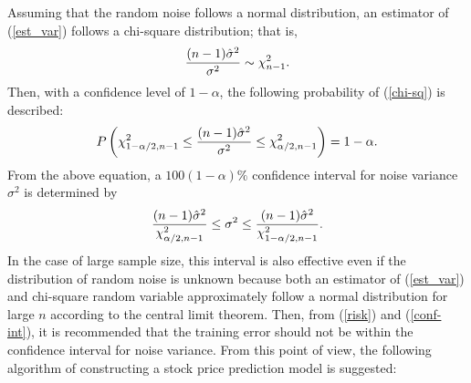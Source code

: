 \documentclass[runningheads,a4paper]{llncs}
\begin{document}
Assuming that the random noise follows a normal distribution, an estimator of (\ref{est_var}) follows
a chi-square distribution; that is,
\begin{equation}
{{(n-1)\hat{\sigma}^2}\over{\sigma^2}} \sim \chi_{n-1}^2.
\label{chi-sq}
\end{equation}
Then, with a confidence level of $1-\alpha$, the following probability of (\ref{chi-sq}) is described:
\begin{equation}
P\left( \chi_{1-\alpha/2, n-1}^2\le {{(n-1)\hat{\sigma}^2}\over{\sigma^2}}\le \chi_{\alpha/2, n-1}^2\right) = 1 - \alpha.
\end{equation}
From the above equation, a $100(1-\alpha)\%$ confidence interval for noise variance $\sigma^2$ is determined by
\begin{equation}
{{(n-1)\hat{\sigma}^2}\over{\chi_{\alpha/2, n-1}^2}}\le \sigma^2 \le {{(n-1)\hat{\sigma}^2}\over{\chi_{1-\alpha/2, n-1}^2}}.
\label{conf-int}
\end{equation}
In the case of large sample size, this interval is also effective even if the distribution of random noise is unknown because both
an estimator of (\ref{est_var}) and chi-square random variable approximately follow a normal distribution for large $n$ according to
the central limit theorem. Then, from (\ref{risk}) and (\ref{conf-int}), it is recommended that the training error should not be
within the confidence interval for noise variance. From this point of view, the following algorithm of constructing a stock price prediction model is suggested:

\vspace{1em}
\end{document}
